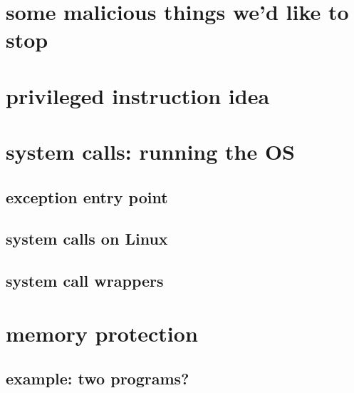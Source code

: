 \date{}
\title{}
\date{}

\begin{frame}
    \titlepage
\end{frame}



\section{some malicious things we'd like to stop}



\section{privileged instruction idea}


\section{system calls: running the OS}

\subsection{exception entry point}


\subsection{system calls on Linux}


\subsection{system call wrappers}


\section{memory protection}

\subsection{example: two programs?}

